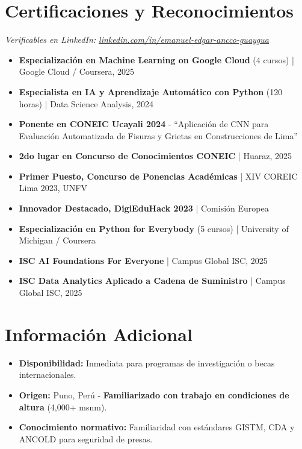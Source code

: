 \documentclass[10pt, a4paper]{article}
\begin{document}
\vspace{3mm}

\section*{Certificaciones y Reconocimientos}
\textit{\small Verificables en LinkedIn: \href{https://www.linkedin.com/in/emanuel-edgar-ancco-guaygua-a61210352}{linkedin.com/in/emanuel-edgar-ancco-guaygua}}
\vspace{2mm}
\begin{itemize}
    \item \textbf{Especialización en Machine Learning on Google Cloud} (4 cursos) | Google Cloud / Coursera, 2025
    \item \textbf{Especialista en IA y Aprendizaje Automático con Python} (120 horas) | Data Science Analysis, 2024
    \item \textbf{Ponente en CONEIC Ucayali 2024} - ``Aplicación de CNN para Evaluación Automatizada de Fisuras y Grietas en Construcciones de Lima''
    \item \textbf{2do lugar en Concurso de Conocimientos CONEIC} | Huaraz, 2025
    \item \textbf{Primer Puesto, Concurso de Ponencias Académicas} | XIV COREIC Lima 2023, UNFV
    \item \textbf{Innovador Destacado, DigiEduHack 2023} | Comisión Europea
    \item \textbf{Especialización en Python for Everybody} (5 cursos) | University of Michigan / Coursera
    \item \textbf{ISC AI Foundations For Everyone} | Campus Global ISC, 2025
    \item \textbf{ISC Data Analytics Aplicado a Cadena de Suministro} | Campus Global ISC, 2025
\end{itemize}

\vspace{3mm}

\section*{Información Adicional}
\begin{itemize}
    \item \textbf{Disponibilidad:} Inmediata para programas de investigación o becas internacionales.
    \item \textbf{Origen:} Puno, Perú - \textbf{Familiarizado con trabajo en condiciones de altura} (4,000+ msnm).
    \item \textbf{Conocimiento normativo:} Familiaridad con estándares GISTM, CDA y ANCOLD para seguridad de presas.
\end{itemize}
\end{document}
